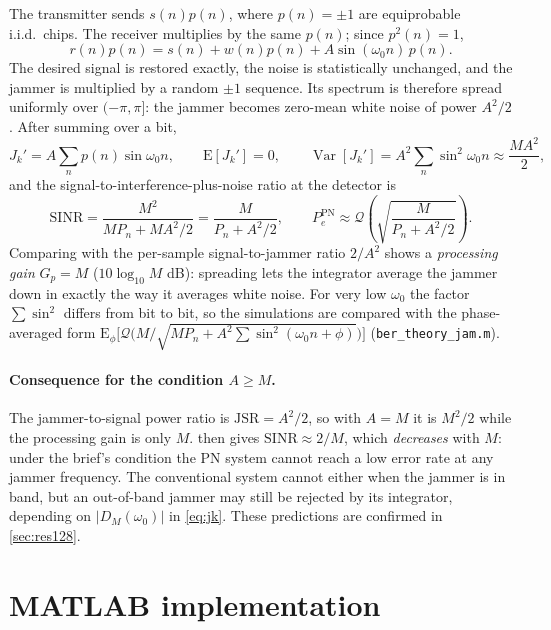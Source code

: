\documentclass[11pt,a4paper]{article}
\newcommand{\Q}{\mathcal{Q}}
\begin{document}
The transmitter sends $s(n)p(n)$, where $p(n)=\pm1$ are equiprobable i.i.d.\ chips.
The receiver multiplies by the same $p(n)$; since $p^2(n)=1$,
\begin{equation}
  r(n)p(n) = s(n) + w(n)p(n) + A\sin(\omega_0 n)\,p(n).
\end{equation}
The desired signal is restored exactly, the noise is statistically unchanged, and
the jammer is multiplied by a random $\pm1$ sequence. Its spectrum is therefore
spread uniformly over $(-\pi,\pi]$: the jammer becomes zero-mean white noise of
power $A^2/2$. After summing over a bit,
\begin{equation}
  J_k' = A\sum_n p(n)\sin\omega_0 n,\qquad
  \mathrm{E}[J_k']=0,\qquad \operatorname{Var}[J_k'] = A^2\sum_n\sin^2\omega_0 n \approx \frac{MA^2}{2},
\end{equation}
and the signal-to-interference-plus-noise ratio at the detector is
\begin{equation}
  \mathrm{SINR} = \frac{M^2}{MP_n + MA^2/2} = \frac{M}{P_n + A^2/2},
  \qquad P_e^{\text{PN}} \approx \Q\!\left(\sqrt{\frac{M}{P_n + A^2/2}}\right).
  \label{eq:pe_pn}
\end{equation}
Comparing with the per-sample signal-to-jammer ratio $2/A^2$ shows a
\emph{processing gain} $G_p = M$ ($10\log_{10}M$ dB): spreading lets the
integrator average the jammer down in exactly the way it averages white noise.
For very low $\omega_0$ the factor $\sum\sin^2$ differs from bit to bit, so the
simulations are compared with the phase-averaged form
$\mathrm{E}_\phi\big[\Q\big(M/\sqrt{MP_n + A^2\sum\sin^2(\omega_0n+\phi)}\big)\big]$
(\texttt{ber\_theory\_jam.m}).

\paragraph{Consequence for the condition $A\ge M$.} The jammer-to-signal power ratio
is $\mathrm{JSR}=A^2/2$, so with $A=M$ it is $M^2/2$ while the processing gain is
only $M$.  then gives $\mathrm{SINR}\approx2/M$, which
\emph{decreases} with $M$: under the brief's condition the PN system cannot reach a
low error rate at any jammer frequency. The conventional system cannot either when
the jammer is in band, but an out-of-band jammer may still be rejected by its
integrator, depending on $|D_M(\omega_0)|$ in \eqref{eq:jk}. These predictions are
confirmed in \cref{sec:res128}.

\section{MATLAB implementation}\label{sec:impl}
\end{document}

